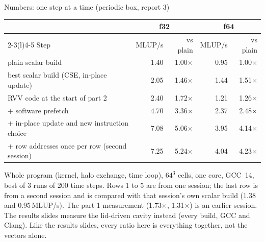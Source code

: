\documentclass[aspectratio=169,10pt,t]{beamer}
\newcommand{\sx}[1]{#1\ensuremath{\times}} %
\begin{document}
\begin{frame}{Numbers: one step at a time (periodic box, report 3)}
  \vspace{1mm}
  \centering
  {\small
  \begin{tabular}{@{}lrrrr@{}}
    \toprule
    & \multicolumn{2}{c}{\textbf{f32}} & \multicolumn{2}{c}{\textbf{f64}}\\
    \cmidrule(lr){2-3}\cmidrule(l){4-5}
    Step & MLUP/s & vs plain & MLUP/s & vs plain\\
    \midrule
    plain scalar build & 1.40 & \sx{1.00} & 0.95 & \sx{1.00}\\
    best scalar build (CSE, in-place update) & 2.05 & \sx{1.46} & 1.44 & \sx{1.51}\\
    RVV code at the start of part 2 & 2.40 & \sx{1.72} & 1.21 & \sx{1.26}\\
    + software prefetch & 4.70 & \sx{3.36} & 2.37 & \sx{2.48}\\
    + in-place update and new instruction choice & 7.08 & \sx{5.06} & 3.95 & \sx{4.14}\\
    + row addresses once per row (second session) & 7.25 & \sx{5.24} & 4.04 & \sx{4.23}\\
    \bottomrule
  \end{tabular}\par}

  \vspace{3mm}
  \raggedright
  {\scriptsize\color{psgray}
  Whole program (kernel, halo exchange, time loop), $64^3$ cells, one core, GCC~14, best of 3
  runs of 200 time steps. Rows 1 to 5 are from one session; the last row is from a second
  session and is compared with that session's own scalar build (1.38 and 0.95\,MLUP/s). The
  part 1 measurement (\sx{1.73}, \sx{1.31}) is an earlier session. The results slides measure the
  lid-driven cavity instead (every build, GCC and Clang). Like the results slides, every ratio here is
  everything together, not the vectors alone.\par}
\end{frame}
\end{document}

